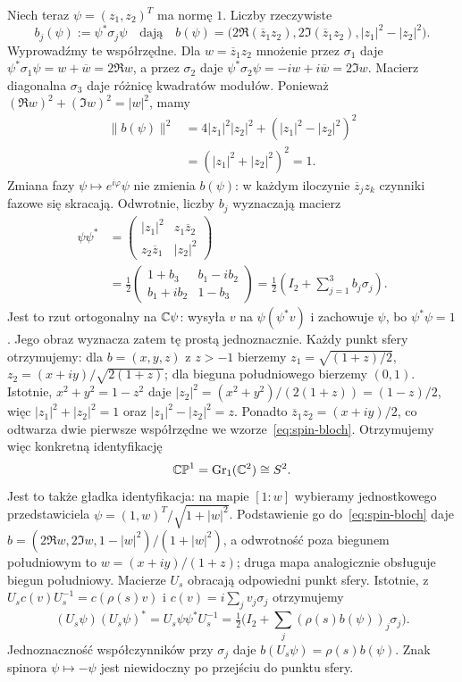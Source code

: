 \begin{przyklad}
Niech teraz $\psi=(z_1,z_2)^T$ ma normę $1$.
Liczby rzeczywiste
\begin{equation}\label{eq:spin-bloch}
 b_j(\psi):=\psi^*\sigma_j\psi
 \quad\text{dają}\quad
 b(\psi)=
 \bigl(2\Re(\overline z_1z_2),
       2\Im(\overline z_1z_2),
       |z_1|^2-|z_2|^2\bigr).
\end{equation}
Wyprowadźmy te współrzędne. Dla $w=\overline z_1z_2$
mnożenie przez $\sigma_1$ daje
$\psi^*\sigma_1\psi=w+\overline w=2\Re w$,
a przez $\sigma_2$ daje
$\psi^*\sigma_2\psi=-iw+i\overline w=2\Im w$.
Macierz diagonalna $\sigma_3$ daje różnicę kwadratów modułów.
Ponieważ $(\Re w)^2+(\Im w)^2=|w|^2$, mamy
\[
 \begin{aligned}
 \|b(\psi)\|^2
 &=4|z_1|^2|z_2|^2+(|z_1|^2-|z_2|^2)^2\\
 &=(|z_1|^2+|z_2|^2)^2=1.
 \end{aligned}
\]
Zmiana fazy $\psi\mapsto e^{i\varphi}\psi$
nie zmienia $b(\psi)$: w każdym iloczynie
$\overline z_jz_k$ czynniki fazowe się skracają.
Odwrotnie, liczby $b_j$ wyznaczają macierz
\[
 \begin{aligned}
 \psi\psi^*
 &=\begin{pmatrix}
 |z_1|^2&z_1\overline z_2\\
 z_2\overline z_1&|z_2|^2
 \end{pmatrix}\\
 &=\frac12\begin{pmatrix}
 1+b_3&b_1-ib_2\\b_1+ib_2&1-b_3
 \end{pmatrix}
 =\frac12\left(I_2+\sum_{j=1}^3b_j\sigma_j\right).
 \end{aligned}
\]
Jest to rzut ortogonalny na $\mathbb{C}\psi$: wysyła $v$ na
$\psi(\psi^*v)$ i zachowuje $\psi$, bo $\psi^*\psi=1$.
Jego obraz wyznacza zatem tę prostą jednoznacznie.
Każdy punkt sfery otrzymujemy: dla
$b=(x,y,z)$ z $z>-1$ bierzemy
$z_1=\sqrt{(1+z)/2}$,
$z_2=(x+iy)/\sqrt{2(1+z)}$;
dla bieguna południowego bierzemy $(0,1)$.
Istotnie, $x^2+y^2=1-z^2$ daje
$|z_2|^2=(x^2+y^2)/(2(1+z))=(1-z)/2$,
więc $|z_1|^2+|z_2|^2=1$ oraz $|z_1|^2-|z_2|^2=z$.
Ponadto $\overline z_1z_2=(x+iy)/2$,
co odtwarza dwie pierwsze współrzędne we wzorze~\eqref{eq:spin-bloch}.
Otrzymujemy więc konkretną identyfikację
\[
 \mathbb{CP}^1=\operatorname{Gr}_1(\mathbb{C}^2)\cong S^2.
\]
Jest to także gładka identyfikacja: na mapie $[1:w]$
wybieramy jednostkowego przedstawiciela
$\psi=(1,w)^T/\sqrt{1+|w|^2}$.
Podstawienie go do~\eqref{eq:spin-bloch} daje
$b=(2\Re w,2\Im w,1-|w|^2)/(1+|w|^2)$,
a odwrotność poza biegunem południowym to $w=(x+iy)/(1+z)$;
druga mapa analogicznie obsługuje biegun południowy.
Macierze $U_s$ obracają odpowiedni punkt sfery.
Istotnie, z $U_sc(v)U_s^{-1}=c(\rho(s)v)$ i $c(v)=i\sum_jv_j\sigma_j$
otrzymujemy
\[
 (U_s\psi)(U_s\psi)^*
 =U_s\psi\psi^*U_s^{-1}
 =\tfrac12\bigl(I_2+\textstyle\sum_j(\rho(s)b(\psi))_j\sigma_j\bigr).
\]
Jednoznaczność współczynników przy $\sigma_j$ daje
$b(U_s\psi)=\rho(s)b(\psi)$.
Znak spinora $\psi\mapsto-\psi$ jest
niewidoczny po przejściu do punktu sfery.
\end{przyklad}

